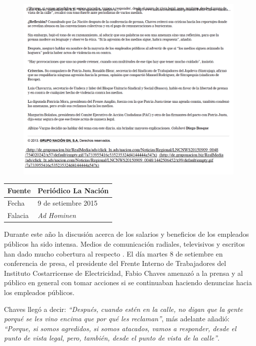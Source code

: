 \documentclass[times]{simauth}
\begin{document}
\begin{figure}[h!]
    \centering
    \includegraphics[width=15cm]{fabio-chaves-2}
    \label{fig:falacia2}
\end{figure}

\newpage
\begin{table}[h!]
    \begin{tabular}{ll} 
        \toprule[1.5pt]
        Fuente & Periódico La Nación\\
        \midrule[0.5pt]
        Fecha  & 9 de setiembre 2015\\
        \midrule[0.5pt]
        Falacia & \textit{Ad Hominen} \\
        \bottomrule[1.5pt]
    \end{tabular} 
\end{table}

Durante este año la discusión acerca de los salarios y beneficios de los empleados públicos ha sido intensa. Medios de comunicación radiales, televisivos y escritos han dado mucho cobertura al respecto .
El día martes 8 de setiembre en conferencia de presa, el presidente del Frente Interno de Trabajadores del Instituto Costarricense de Electricidad, Fabio Chaves amenazó a la prensa y al público en general con tomar acciones si se continuaban haciendo denuncias hacia los empleados públicos.

Chaves llegó a decir: \textit{``Después, cuando estén en la calle, no digan que la gente porqué se les vino encima que por qué les reclaman''}, más adelante añadió: \textit{``Porque, si somos agredidos, si somos atacados, vamos a responder, desde el punto de vista legal, pero, también, desde el punto de vista de la calle''}.
\end{document}
